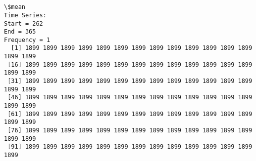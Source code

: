 \documentclass[11pt]{article}
\begin{document}
    \begin{center}
    \end{center}
    { \hspace*{\fill} \\}
    
    \begin{center}
    \end{center}
    { \hspace*{\fill} \\}
    
    \begin{Verbatim}[commandchars=\\\{\}]
\$mean
Time Series:
Start = 262 
End = 365 
Frequency = 1 
  [1] 1899 1899 1899 1899 1899 1899 1899 1899 1899 1899 1899 1899 1899 1899 1899
 [16] 1899 1899 1899 1899 1899 1899 1899 1899 1899 1899 1899 1899 1899 1899 1899
 [31] 1899 1899 1899 1899 1899 1899 1899 1899 1899 1899 1899 1899 1899 1899 1899
 [46] 1899 1899 1899 1899 1899 1899 1899 1899 1899 1899 1899 1899 1899 1899 1899
 [61] 1899 1899 1899 1899 1899 1899 1899 1899 1899 1899 1899 1899 1899 1899 1899
 [76] 1899 1899 1899 1899 1899 1899 1899 1899 1899 1899 1899 1899 1899 1899 1899
 [91] 1899 1899 1899 1899 1899 1899 1899 1899 1899 1899 1899 1899 1899 1899


\end{Verbatim}
\end{document}
